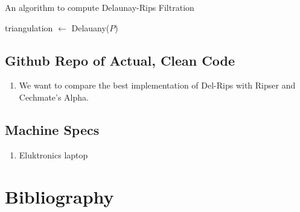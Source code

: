 \documentclass[letterpaper,titlepage]{article}
\begin{document}

\begin{algorithm}
\caption{An algorithm to compute Delaunay-Rips Filtration}\label{alg:one}
triangulation $\gets$ Delauany($P$)


\end{algorithm}


\subsection{Github Repo of Actual, Clean Code}
\begin{enumerate}
    \item We want to compare the best implementation of Del-Rips with Ripser and Cechmate's Alpha.
\end{enumerate}

\subsection{Machine Specs}
\begin{enumerate}
    \item Eluktronics laptop
\end{enumerate}


\section{Bibliography}

\printbibliography[
heading=bibintoc,
title={Whole bibliography}
] %


\end{document}
